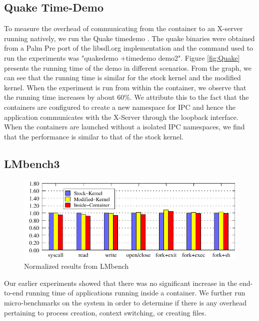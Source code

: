 \subsection{Quake Time-Demo}
\label{sec:quake_demo}
To measure the overhead of communicating from the container to an X-server running natively, we run the Quake timedemo . The quake binaries were obtained from a Palm Pre port of the libsdl.org implementation and the command used to run the experiments was "quakedemo +timedemo demo2". Figure \ref{fig:Quake} presents the running time of the demo in different scenarios. From the graph, we can see that the running time is similar for the stock kernel and the modified kernel. When the experiment is run from within the container, we observe that the running time increases by about 60\%. We attribute this to the fact that the containers are configured to create a new namespace for IPC and hence the application communicates with the X-Server through the loopback interface. When the containers are launched without a isolated IPC namespaces, we find that the performance is similar to that of the stock kernel.

\subsection{LMbench3} 
\label{sec:LMbench3}

\begin{figure}[bth]
\centering
\includegraphics[width=2.0\columnwidth]{lmbench}
\caption{Normalized results from LMbench}
\label{fig:lmbench}
\end{figure}

Our earlier experiments showed that there was no significant increase in the end-to-end running time of applications running inside a container.  We further run micro-benchmarks on the system in order to determine if there is any overhead pertaining to process creation, context switching, or creating files.

